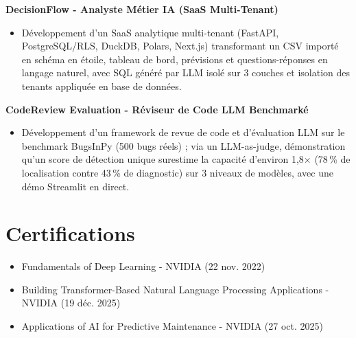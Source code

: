 \documentclass[11pt,a4paper]{article}
\newcommand{\proj}[1]{\textbf{#1}\par}
\begin{document}
\proj{DecisionFlow - Analyste Métier IA (SaaS Multi-Tenant)}
\begin{itemize}
  \item Développement d'un SaaS analytique multi-tenant (FastAPI, PostgreSQL/RLS, DuckDB, Polars, Next.js)
        transformant un CSV importé en schéma en étoile, tableau de bord, prévisions et questions-réponses
        en langage naturel, avec SQL généré par LLM isolé sur 3 couches et isolation des tenants appliquée
        en base de données.
\end{itemize}

\proj{CodeReview Evaluation - Réviseur de Code LLM Benchmarké}
\begin{itemize}
  \item Développement d'un framework de revue de code et d'évaluation LLM sur le benchmark BugsInPy
        (500 bugs réels) ; via un LLM-as-judge, démonstration qu'un score de détection unique surestime la
        capacité d'environ 1,8$\times$ (78\,\% de localisation contre 43\,\% de diagnostic) sur 3 niveaux de
        modèles, avec une démo Streamlit en direct.
\end{itemize}

\section{Certifications}
\begin{itemize}
  \item Fundamentals of Deep Learning - NVIDIA {\color{muted}(22 nov. 2022)}
  \item Building Transformer-Based Natural Language Processing Applications - NVIDIA {\color{muted}(19 déc. 2025)}
  \item Applications of AI for Predictive Maintenance - NVIDIA {\color{muted}(27 oct. 2025)}
\end{itemize}

\end{document}
